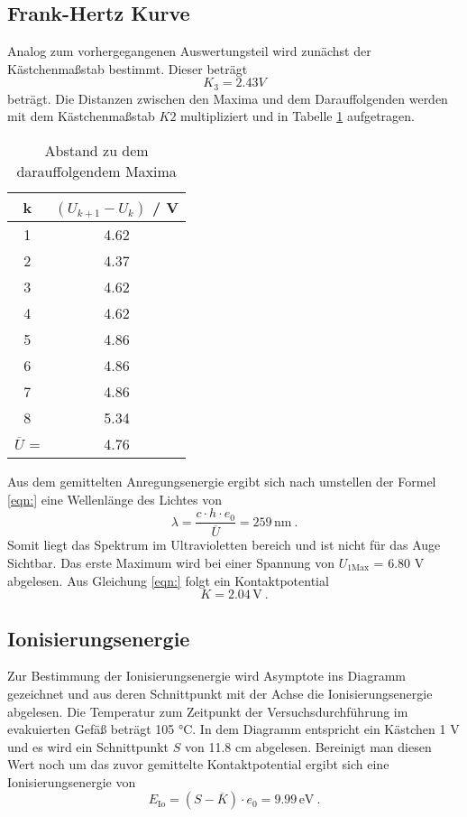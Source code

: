 \subsection{Frank-Hertz Kurve}
Analog zum vorhergegangenen Auswertungsteil wird zunächst der Kästchenmaßstab bestimmt. Dieser beträgt 
\begin{equation}
  K_3 = 2.43 V
  \label{eqn:K3}
\end{equation}
beträgt. Die Distanzen zwischen den Maxima und dem Darauffolgenden werden mit dem Kästchenmaßstab $K2$ multipliziert und in Tabelle \ref{tab:Max} aufgetragen.
\begin{table}
  \centering
  \begin{tabular}{c c}
    \toprule
    	k & $(U_{k+1} - U_k)$ / V \\
    \midrule
    	1 & 4.62	\\
    	2 & 4.37	\\
    	3 & 4.62	\\
    	4 & 4.62	\\
    	5 & 4.86	\\
    	6 & 4.86	\\
    	7 & 4.86	\\
    	8 & 5.34	\\
    \midrule
    	$\overline{U}$  = & 4.76 \\
    \bottomrule
  \end{tabular}
  \caption{Abstand zu dem darauffolgendem Maxima}
  \label{tab:Max}
\end{table}
Aus dem gemittelten Anregungsenergie ergibt sich nach umstellen der Formel \ref{eqn:} eine Wellenlänge des Lichtes von 
\begin{equation}
  \lambda = \frac{c \cdot h \cdot e_0}{\overline{U}} = 259 \, \text{nm} \ .
  \label{eqn:spek}
\end{equation}
Somit liegt das Spektrum im Ultravioletten bereich und ist nicht für das Auge Sichtbar. Das erste Maximum wird bei einer Spannung von $U_{1 \text{Max}}$ = 6.80 V abgelesen. Aus Gleichung \ref{eqn:} folgt ein Kontaktpotential 
\begin{equation}
  K = 2.04 \, \text{V} \ .
  \label{eqn:KonFr}
\end{equation}
\subsection{Ionisierungsenergie}
Zur Bestimmung der Ionisierungsenergie wird Asymptote ins Diagramm gezeichnet und aus deren Schnittpunkt mit der Achse die Ionisierungsenergie abgelesen. Die Temperatur zum Zeitpunkt der Versuchsdurchführung im evakuierten Gefäß beträgt 105 °C. In dem Diagramm entspricht ein Kästchen 1 V und es wird ein Schnittpunkt $S$ von 11.8 cm abgelesen. Bereinigt man diesen Wert noch um das zuvor gemittelte Kontaktpotential ergibt sich eine Ionisierungsenergie von 
\begin{equation}
  E_\text{Io} = (S - \overline{K}) \cdot e_0 = 9.99 \, \text{eV} \ .
  \label{eqn:EIo}
\end{equation}

